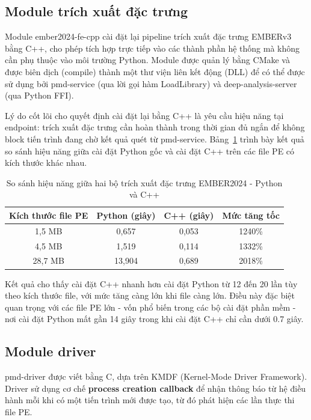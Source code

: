 \subsection{Module trích xuất đặc trưng}
\label{sec:fe_cpp}

Module ember2024-fe-cpp cài đặt lại pipeline trích xuất đặc trưng
EMBERv3 bằng C++, cho phép tích hợp trực tiếp vào các thành phần
hệ thống mà không cần phụ thuộc vào môi trường Python. Module được
quản lý bằng CMake và được biên dịch (compile) thành một thư viện
liên kết động (DLL) để có thể được sử dụng bởi pmd-service (qua
lời gọi hàm LoadLibrary) và deep-analysis-server (qua Python FFI).

Lý do cốt lõi cho quyết định cài đặt lại bằng C++ là yêu cầu hiệu
năng tại endpoint: trích xuất đặc trưng cần hoàn thành trong thời
gian đủ ngắn để không block tiến trình đang chờ kết quả quét từ pmd-service.
Bảng~\ref{tab:fe_perf} trình bày kết quả so sánh hiệu năng giữa cài
đặt Python gốc và cài đặt C++ trên các file PE có kích thước khác
nhau.

\begin{table}[h]
\centering
\caption{So sánh hiệu năng giữa hai bộ trích xuất đặc trưng EMBER2024
- Python và C++}
\label{tab:fe_perf}
\begin{tabular}{cccc}
\toprule
\textbf{Kích thước file PE} &
\textbf{Python (giây)} &
\textbf{C++ (giây)} &
\textbf{Mức tăng tốc} \\
\midrule
1,5 MB  & 0,657  & 0,053 & 1240\% \\
4,5 MB  & 1,519  & 0,114 & 1332\% \\
28,7 MB & 13,904 & 0,689 & 2018\% \\
\bottomrule
\end{tabular}
\end{table}

Kết quả cho thấy cài đặt C++ nhanh hơn cài đặt Python từ 12 đến
20 lần tùy theo kích thước file, với mức tăng càng lớn khi file
càng lớn. Điều này đặc biệt quan trọng với các file PE lớn - vốn
phổ biến trong các bộ cài đặt phần mềm - nơi cài đặt Python mất
gần 14 giây trong khi cài đặt C++ chỉ cần dưới 0.7 giây.

\subsection{Module driver}

pmd-driver được viết bằng C, dựa trên KMDF (Kernel-Mode Driver
Framework). Driver sử dụng cơ chế \textbf{process creation callback}
để nhận thông báo từ hệ điều hành mỗi khi có một tiến trình mới được
tạo, từ đó phát hiện các lần thực thi file PE.

